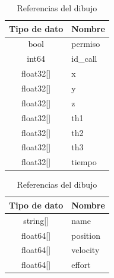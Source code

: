         \begingroup
            \renewcommand{\arraystretch}{1.5}
            \begin{table}[H]
                \centering
                \begin{tabular}{c m{2.5cm}}
                   \hline                   \hline
                   \textbf{Tipo de dato}  & \textbf{Nombre}    \\\hline \hline 
                   bool &  permiso
                   \\\hline
                   int64 &  id\_call
                   \\\hline
                   float32[] &  x
                   \\\hline
                   float32[] &  y
                   \\\hline
                   float32[] &  z
                   \\\hline
                   float32[] &  th1
                   \\\hline
                   float32[] &  th2
                   \\\hline
                   float32[] &  th3
                   \\\hline
                   float32[] &  tiempo
                      \\\hline                   \hline
                \end{tabular}
                \caption{Referencias del dibujo}
                \label{tab:cap6_rviz_1_msg}
            \end{table}
        \endgroup
        
        \begingroup
            \renewcommand{\arraystretch}{1.5}
            \begin{table}[H]
                \centering
                \begin{tabular}{c m{2.5cm}}
                   \hline                   \hline
                   \textbf{Tipo de dato}  & \textbf{Nombre}    \\\hline \hline 
                    string[]  & name
                   \\\hline
                    float64[]  & position
                   \\\hline
                    float64[]  & velocity
                   \\\hline
                    float64[] &  effort
                    \\\hline                   \hline
                \end{tabular}
                \caption{Referencias del dibujo}
                \label{tab:cap6_rviz_2_msg}
            \end{table}
        \endgroup

